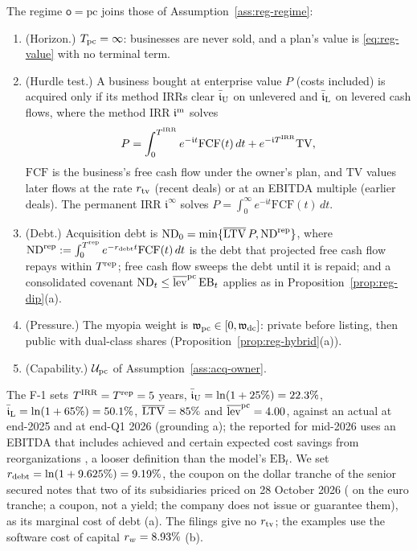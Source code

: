 \begin{assumption}\label{ass:acq-pc}
The regime $\mathsf o=\mathrm{pc}$ joins those of Assumption~\ref{ass:reg-regime}:
\begin{enumerate}
\item[(i)] (Horizon.) $T_{\rm pc}=\infty$: businesses are never sold, and a plan's value is \eqref{eq:reg-value} with no terminal term.
\item[(ii)] (Hurdle test.) A business bought at enterprise value $P$ (costs included) is acquired only if its method IRRs clear $\bar{\mathfrak i}_{\rm U}$ on unlevered and $\bar{\mathfrak i}_{\rm L}$ on levered cash flows, where the method IRR $\mathfrak i^{\rm m}$ solves
\begin{equation}\label{eq:acq-method}
P=\int_0^{T^{\rm IRR}}e^{-\mathfrak it}\mathrm{FCF}(t)\,dt+e^{-\mathfrak iT^{\rm IRR}}\mathrm{TV},
\end{equation}
$\mathrm{FCF}$ is the business's free cash flow under the owner's plan, and $\mathrm{TV}$ values later flows at the rate $r_{\rm tv}$ (recent deals) or at an EBITDA multiple (earlier deals). The permanent IRR $\mathfrak i^\infty$ solves $P=\int_0^\infty e^{-\mathfrak it}\mathrm{FCF}(t)\,dt$.
\item[(iii)] (Debt.) Acquisition debt is $\mathrm{ND}_0=\min\{\overline{\mathrm{LTV}}\,P,\mathrm{ND}^{\rm rep}\}$, where $\mathrm{ND}^{\rm rep}:=\int_0^{T^{\rm rep}}e^{-r_{\rm debt}t}\mathrm{FCF}(t)\,dt$ is the debt that projected free cash flow repays within $T^{\rm rep}$; free cash flow sweeps the debt until it is repaid; and a consolidated covenant $\mathrm{ND}_t\le\overline{\rm lev}^{\rm pc}\,\mathrm{EB}_t$ applies as in Proposition~\ref{prop:reg-dip}(a).
\item[(iv)] (Pressure.) The myopia weight is $\mathfrak w_{\rm pc}\in[0,\mathfrak w_{\rm dc}]$: private before listing, then public with dual-class shares (Proposition~\ref{prop:reg-hybrid}(a)).
\item[(v)] (Capability.) $\mathcal U_{\rm pc}$ of Assumption~\ref{ass:acq-owner}.
\end{enumerate}
The F-1 sets $T^{\rm IRR}=T^{\rm rep}=5$ years, $\bar{\mathfrak i}_{\rm U}=\ln(1+25\%)=22.3\%$, $\bar{\mathfrak i}_{\rm L}=\ln(1+65\%)=50.1\%$, $\overline{\mathrm{LTV}}=85\%$ and $\overline{\rm lev}^{\rm pc}=4.00$, against an actual \acqLevTwentyFive{} at end-2025 and \acqLevQOne{} at end-Q1 2026 (grounding a); the \acqLevQTwo{} reported for mid-2026 uses an EBITDA that includes achieved and certain expected cost savings from reorganizations \citep{bendingspoons2026sixk}, a looser definition than the model's $\mathrm{EB}_t$. We set $r_{\rm debt}=\ln(1+9.625\%)=9.19\%$, the coupon on the dollar tranche of the senior secured notes that two of its subsidiaries priced on 28 October 2026 (\acqNotesEurC{} on the euro tranche; a coupon, not a yield; the company does not issue or guarantee them), as its marginal cost of debt (a). The filings give no $r_{\rm tv}$; the examples use the software cost of capital $r_w=8.93\%$ (b).
\end{assumption}

